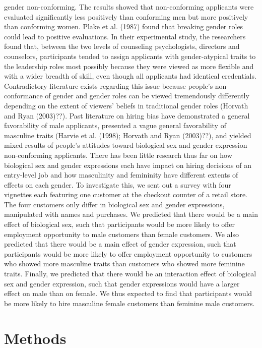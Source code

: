 \documentclass[english,man]{apa6}
\theoremstyle{definition}
\theoremstyle{definition}
\theoremstyle{remark}
\begin{document}
gender non-conforming. The results showed that non-conforming applicants
were evaluated significantly less positively than conforming men but
more positively than conforming women. Plake et al. (1987) found that
breaking gender roles could lead to positive evaluations. In their
experimental study, the researchers found that, between the two levels
of counseling psychologists, directors and counselors, participants
tended to assign applicants with gender-atypical traits to the
leadership roles most possibly because they were viewed as more flexible
and with a wider breadth of skill, even though all applicants had
identical credentials. Contradictory literature exists regarding this
issue because people's non-conformance of gender and gender roles can be
viewed tremendously differently depending on the extent of viewers'
beliefs in traditional gender roles (Horvath and Ryan (2003)??). Past
literature on hiring bias have demonstrated a general favorability of
male applicants, presented a vague general favorability of masculine
traits (Harvie et al. (1998); Horvath and Ryan (2003)??), and yielded
mixed results of people's attitudes toward biological sex and gender
expression non-conforming applicants. There has been little research
thus far on how biological sex and gender expressions each have impact
on hiring decisions of an entry-level job and how masculinity and
femininity have different extents of effects on each gender. To
investigate this, we sent out a survey with four vignettes each
featuring one customer at the checkout counter of a retail store. The
four customers only differ in biological sex and gender expressions,
manipulated with names and purchases. We predicted that there would be a
main effect of biological sex, such that participants would be more
likely to offer employment opportunity to male customers than female
customers. We also predicted that there would be a main effect of gender
expression, such that participants would be more likely to offer
employment opportunity to customers who showed more masculine traits
than customers who showed more feminine traits. Finally, we predicted
that there would be an interaction effect of biological sex and gender
expression, such that gender expressions would have a larger effect on
male than on female. We thus expected to find that participants would be
more likely to hire masculine female customers than feminine male
customers.

\section{Methods}\label{methods}
\end{document}
